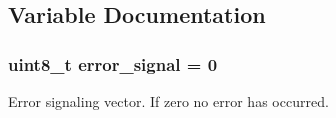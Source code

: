 \subsection{\-Variable \-Documentation}
\hypertarget{group__user__interface_ga3f996476795917a4b1ace8c6c5e4b28a}{
\subsubsection[{error\-\_\-signal}]{\setlength{\rightskip}{0pt plus 5cm}uint8\-\_\-t {\bf error\-\_\-signal} = 0}}
\label{group__user__interface_ga3f996476795917a4b1ace8c6c5e4b28a}


\-Error signaling vector. \-If zero no error has occurred. 

